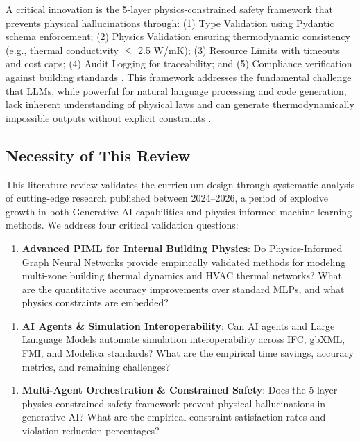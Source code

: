 \documentclass[12pt,a4paper]{article}
\begin{document}
A critical innovation is the 5-layer physics-constrained safety framework that prevents physical hallucinations through: (1) Type Validation using Pydantic schema enforcement; (2) Physics Validation ensuring thermodynamic consistency (e.g., thermal conductivity $\leq$ 2.5 W/mK); (3) Resource Limits with timeouts and cost caps; (4) Audit Logging for traceability; and (5) Compliance verification against building standards \cite{ref11}. This framework addresses the fundamental challenge that LLMs, while powerful for natural language processing and code generation, lack inherent understanding of physical laws and can generate thermodynamically impossible outputs without explicit constraints \cite{ref12}.

\subsection{Necessity of This Review}

This literature review validates the curriculum design through systematic analysis of cutting-edge research published between 2024--2026, a period of explosive growth in both Generative AI capabilities and physics-informed machine learning methods. We address four critical validation questions:

\begin{enumerate}
  \item \textbf{Advanced PIML for Internal Building Physics}: Do Physics-Informed Graph Neural Networks provide empirically validated methods for modeling multi-zone building thermal dynamics and HVAC thermal networks? What are the quantitative accuracy improvements over standard MLPs, and what physics constraints are embedded?
\end{enumerate}

\begin{enumerate}
  \item \textbf{AI Agents \& Simulation Interoperability}: Can AI agents and Large Language Models automate simulation interoperability across IFC, gbXML, FMI, and Modelica standards? What are the empirical time savings, accuracy metrics, and remaining challenges?
\end{enumerate}

\begin{enumerate}
  \item \textbf{Multi-Agent Orchestration \& Constrained Safety}: Does the 5-layer physics-constrained safety framework prevent physical hallucinations in generative AI? What are the empirical constraint satisfaction rates and violation reduction percentages?
\end{enumerate}
\end{document}
